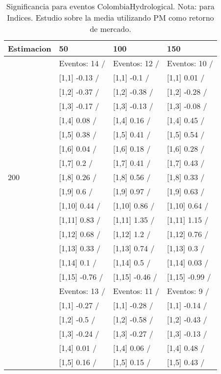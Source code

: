 \begin{table}

\caption{Significancia para eventos ColombiaHydrological. Nota: para Indices. Estudio sobre la media utilizando PM como retorno de mercado.}
\centering
\begin{tabular}[t]{llll}
\toprule
Estimacion & 50 & 100 & 150\\
\midrule
 & Eventos:  14 / & Eventos:  12 / & Eventos:  10 /\\
 & {}[1,1] -0.13  / & {}[1,1] -0.1  / & {}[1,1] 0.01  /\\
 & {}[1,2] -0.37  / & {}[1,2] -0.38  / & {}[1,2] -0.28  /\\
 & {}[1,3] -0.17  / & {}[1,3] -0.13  / & {}[1,3] -0.08  /\\
 & {}[1,4] 0.08  / & {}[1,4] 0.16  / & {}[1,4] 0.45  /\\
\addlinespace
 & {}[1,5] 0.38  / & {}[1,5] 0.41  / & {}[1,5] 0.54  /\\
 & {}[1,6] 0.04  / & {}[1,6] 0.18  / & {}[1,6] 0.28  /\\
 & {}[1,7] 0.2  / & {}[1,7] 0.41  / & {}[1,7] 0.43  /\\
200 & {}[1,8] 0.26  / & {}[1,8] 0.56  / & {}[1,8] 0.33  /\\
 & {}[1,9] 0.6  / & {}[1,9] 0.97  / & {}[1,9] 0.63  /\\
\addlinespace
 & {}[1,10] 0.44  / & {}[1,10] 0.86  / & {}[1,10] 0.64  /\\
 & {}[1,11] 0.83  / & {}[1,11] 1.35  / & {}[1,11] 1.15  /\\
 & {}[1,12] 0.68  / & {}[1,12] 1.2  / & {}[1,12] 0.76  /\\
 & {}[1,13] 0.33  / & {}[1,13] 0.74  / & {}[1,13] 0.3  /\\
 & {}[1,14] 0.1  / & {}[1,14] 0.5  / & {}[1,14] 0.03  /\\
\addlinespace
 & {}[1,15] -0.76  / & {}[1,15] -0.46  / & {}[1,15] -0.99  /\\
 & Eventos:  13 / & Eventos:  11 / & Eventos:  9 /\\
 & {}[1,1] -0.27  / & {}[1,1] -0.28  / & {}[1,1] -0.14  /\\
 & {}[1,2] -0.5  / & {}[1,2] -0.58  / & {}[1,2] -0.43  /\\
 & {}[1,3] -0.24  / & {}[1,3] -0.27  / & {}[1,3] -0.13  /\\
\addlinespace
 & {}[1,4] 0.01  / & {}[1,4] 0.06  / & {}[1,4] 0.48  /\\
 & {}[1,5] 0.16  / & {}[1,5] 0.15  / & {}[1,5] 0.43  /\\

\end{tabular}
\end{table}

